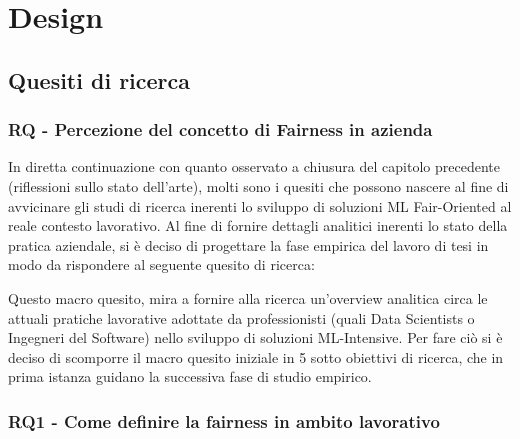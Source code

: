 \chapter{Design} %
%
    \section{Quesiti di ricerca}
    \subsection{RQ - Percezione del concetto di Fairness in azienda}
    
    In diretta continuazione con quanto osservato a chiusura del capitolo precedente (riflessioni sullo stato dell'arte), molti sono i quesiti che possono nascere al fine di avvicinare gli studi di ricerca inerenti lo sviluppo di soluzioni ML Fair-Oriented al reale contesto lavorativo. Al fine di fornire dettagli analitici inerenti lo stato della pratica aziendale, si è deciso di progettare la fase empirica del lavoro di tesi in modo da rispondere al seguente quesito di ricerca:
    
    \begin{center}
		\hspace*{-5mm}%
	\end{center}
	
	Questo macro quesito, mira a fornire alla ricerca un'overview analitica circa le attuali pratiche lavorative adottate da professionisti (quali Data Scientists o Ingegneri del Software) nello sviluppo di soluzioni ML-Intensive. Per fare ciò si è deciso di scomporre il macro quesito iniziale in 5 sotto obiettivi di ricerca, che in prima istanza guidano la successiva fase di studio empirico.\\
	
	\subsection{RQ1 - Come definire la fairness in ambito lavorativo}
	\begin{center}
			\hspace*{-5mm}%
	\end{center}


